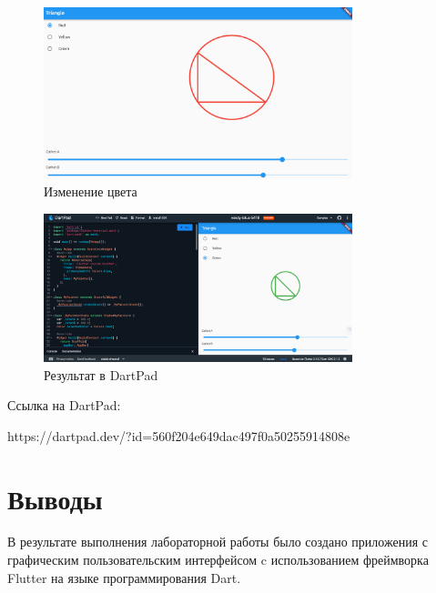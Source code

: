 \documentclass[a4paper, 14pt]{extarticle}
\begin{document}
\begin{figure}[!htb]
	\centering
	\includegraphics[width=0.8\textwidth]{img4}
\caption{Изменение цвета}
\label{fig:img4}
\end{figure}

\begin{figure}[!htb]
	\centering
	\includegraphics[width=0.8\textwidth]{img5}
\caption{Результат в DartPad}
\label{fig:img5}
\end{figure}

Ссылка на DartPad: 

https://dartpad.dev/?id=560f204e649dac497f0a50255914808e

\section{Выводы}\label{Sect::conclusion}

В результате выполнения лабораторной работы было создано приложения с графическим пользовательским интерфейсом c использованием фреймворка Flutter на языке программирования Dart.
\end{document}
